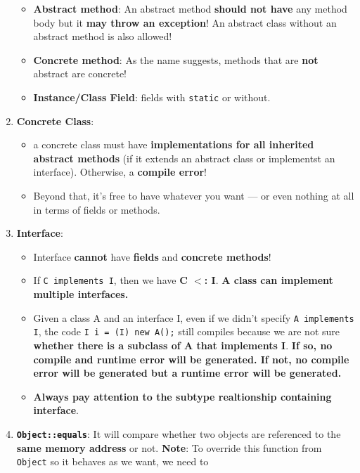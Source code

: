 \documentclass[10pt, landscape]{article}
\begin{document}
\begin{multicols}{4}
\begin{enumerate}
    \begin{itemize}
        \item \textbf{Abstract method}: An abstract method \textbf{should not have} any method body but it \textbf{may throw an exception}! An abstract class without an abstract method is also allowed!
        \item \textbf{Concrete method}: As the name suggests, methods that are \textbf{not} abstract are concrete!
        \item \textbf{Instance/Class Field}: fields with \texttt{static} or without.
    \end{itemize}
    \item \textbf{Concrete Class}:
    \begin{itemize}
        \item a concrete class must have \textbf{implementations for all inherited abstract methods} (if it extends an abstract class or implementst an interface). Otherwise, a \textbf{compile error}!
        \item Beyond that, it’s free to have whatever you want — or even nothing at all in terms of fields or methods.
    \end{itemize}
    \item \textbf{Interface}:
    \begin{itemize}
        \item Interface \textbf{cannot} have \textbf{fields} and \textbf{concrete methods}!
        \item If \texttt{C implements I}, then we have \textbf{C $<$: I}. \textbf{A class can implement multiple interfaces.}
        \item Given a class A and an interface I, even if we didn't specify \texttt{A implements I}, the code \texttt{I i = (I) new A();} still compiles because we are not sure \textbf{whether there is a subclass of A that implements I}. \textbf{If so, no compile and runtime error will be generated. If not, no compile error will be generated but a runtime error will be generated.}
        \item \textbf{Always pay attention to the subtype realtionship containing interface}.
    \end{itemize}
    \item \textbf{\texttt{Object::equals}}: It will compare whether two objects are referenced to the \textbf{same memory address} or not.
    \textbf{Note}: To override this function from \texttt{Object} so it behaves as we want, we need to 
    \begin{itemize}

\end{itemize}
\end{enumerate}
\end{multicols}
\end{document}
